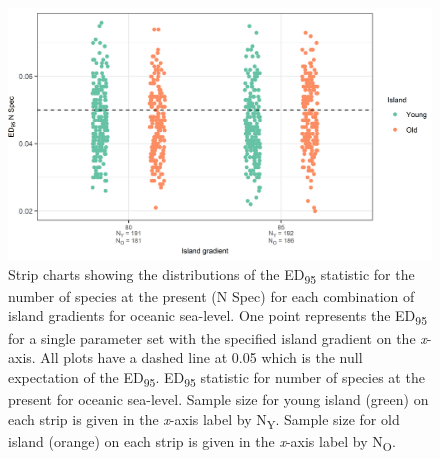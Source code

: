 \begin{figure}
    \centering
    \includegraphics{oceanic_gradient_sea_level_num_spec.png}
    \caption{Strip charts showing the distributions of the ED\textsubscript{95} statistic for the number of species at the present (N Spec) for each combination of island gradients for oceanic sea-level. One point represents the ED\textsubscript{95} for a single parameter set with the specified island gradient on the \textit{x}-axis. All plots have a dashed line at 0.05 which is the null expectation of the ED\textsubscript{95}. ED\textsubscript{95} statistic for number of species at the present for oceanic sea-level. Sample size for young island (green) on each strip is given in the \textit{x}-axis label by N\textsubscript{Y}. Sample size for old island (orange) on each strip is given in the \textit{x}-axis label by N\textsubscript{O}.}
    \label{fig:oceanic_gradient_sea_level_num_spec}
\end{figure}

